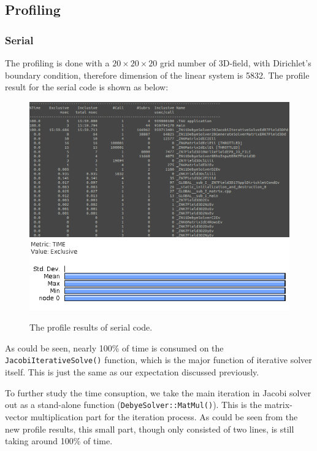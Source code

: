 \documentclass{article}
\begin{document}
\begin{spacing}{1.1}
\subsection{Profiling}

\subsubsection{Serial}

The profiling is done with a $ 20\times 20 \times 20$ grid number of 3D-field, with Dirichlet's boundary condition, therefore dimension of the linear system is 5832. The profile result for the serial code is shown as below:

\begin{figure}[H]
  \centering
  \includegraphics[width=\linewidth]{output/serial-previous-text.png}
  \includegraphics[width=0.6\linewidth]{output/serial-previous.png}
  \caption{The profile results of serial code.}
  \label{fig-testcase}
\end{figure}

As could be seen, nearly 100\% of time is consumed on the \texttt{JacobiIterativeSolve()} function, which is the major function of iterative solver itself. This is just the same as our expectation discussed previously.

To further study the time consuption, we take the main iteration in Jacobi solver out as a stand-alone function (\texttt{DebyeSolver::MatMul()}). This is the matrix-vector multiplication part for the iteration process. As could be seen from the new profile results, this small part, though only consisted of two lines, is still taking around 100\% of time.


\end{spacing}
\end{document}
